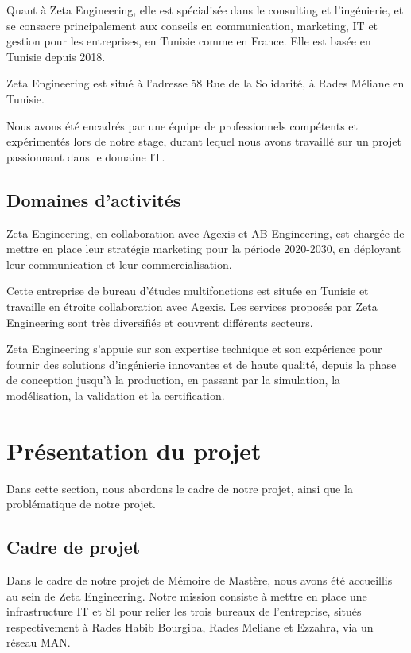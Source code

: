 Quant à Zeta Engineering, elle est spécialisée dans le consulting et l'ingénierie, et se consacre principalement aux conseils en communication, marketing, IT et gestion pour les entreprises, en Tunisie comme en France. Elle est basée en Tunisie depuis 2018.


Zeta Engineering est situé à l'adresse 58 Rue de la Solidarité, à Rades Méliane en Tunisie.


Nous avons été encadrés par une équipe de professionnels compétents et expérimentés lors de notre stage, durant lequel nous avons travaillé sur un projet passionnant dans le domaine IT.





\subsection{Domaines d'activités}
Zeta Engineering, en collaboration avec Agexis et AB Engineering, est chargée de mettre en place leur stratégie marketing pour la période 2020-2030, en déployant leur communication et leur commercialisation.


Cette entreprise de bureau d'études multifonctions est située en Tunisie et travaille en étroite collaboration avec Agexis. Les services proposés par Zeta Engineering sont très diversifiés et couvrent différents secteurs.

Zeta Engineering s'appuie sur son expertise technique et son expérience pour fournir des solutions d'ingénierie innovantes et de haute qualité, depuis la phase de conception jusqu'à la production, en passant par la simulation, la modélisation, la validation et la certification. 





\section{Présentation du projet}

Dans cette section, nous abordons le cadre de notre projet, ainsi que la problématique de notre projet.


\subsection{Cadre de projet}
Dans le cadre de notre projet de Mémoire de Mastère, nous avons été accueillis au sein de Zeta Engineering. Notre mission consiste à mettre en place une infrastructure IT et SI pour relier les trois bureaux de l'entreprise, situés respectivement à Rades Habib Bourgiba, Rades Meliane et Ezzahra, via un réseau MAN.\\


